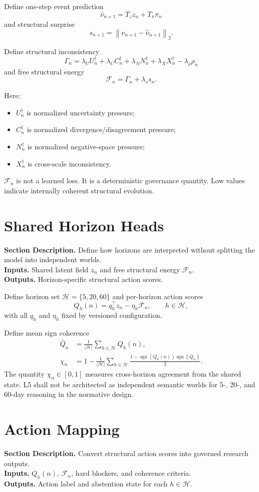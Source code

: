 \documentclass[11pt]{report}
\newcommand{\sgn}{\operatorname{sgn}}
\newcommand{\norm}[1]{\left\lVert #1 \right\rVert}
\newcommand{\meta}[3]{\textbf{Section Description.} #1\\
\textbf{Inputs.} #2\\
\textbf{Outputs.} #3\par}
\begin{document}
Define one-step event prediction
\[
\hat \nu_{n+1} = T_z z_n + T_\pi \pi_n
\]
and structural surprise
\[
s_{n+1} = \norm{\nu_{n+1}-\hat \nu_{n+1}}_2.
\]

Define structural inconsistency
\[
\Gamma_n = \lambda_U U_n^{\dagger} + \lambda_C C_n^{\dagger} + \lambda_N N_n^{\dagger} + \lambda_X X_n^{\dagger} - \lambda_\rho \rho_n
\]
and free structural energy
\[
\mathcal{F}_n = \Gamma_n + \lambda_s s_n.
\]

Here:
\begin{itemize}
    \item $U_n^{\dagger}$ is normalized uncertainty pressure;
    \item $C_n^{\dagger}$ is normalized divergence/disagreement pressure;
    \item $N_n^{\dagger}$ is normalized negative-space pressure;
    \item $X_n^{\dagger}$ is cross-scale inconsistency.
\end{itemize}

$\mathcal{F}_n$ is not a learned loss. It is a deterministic governance quantity. Low values indicate internally coherent structural evolution.

\section{Shared Horizon Heads}
\meta{Define how horizons are interpreted without splitting the model into independent worlds.}{Shared latent field $z_n$ and free structural energy $\mathcal{F}_n$.}{Horizon-specific structural action scores.}

Define horizon set $\mathcal{H}=\{5,20,60\}$ and per-horizon action scores
\[
Q_h(n)=q_h^{\top}z_n - \eta_h\mathcal{F}_n,\qquad h\in\mathcal{H},
\]
with all $q_h$ and $\eta_h$ fixed by versioned configuration.

Define mean sign coherence
\begin{align*}
\bar Q_n &= \frac{1}{|\mathcal{H}|}\sum_{h\in\mathcal{H}}Q_h(n),\\
\chi_n &= 1-\frac{1}{|\mathcal{H}|}\sum_{h\in\mathcal{H}}\frac{1-\sgn(Q_h(n))\sgn(\bar Q_n)}{2}.
\end{align*}
The quantity $\chi_n\in[0,1]$ measures cross-horizon agreement from the shared state. L5 shall not be architected as independent semantic worlds for 5-, 20-, and 60-day reasoning in the normative design.

\section{Action Mapping}
\meta{Convert structural action scores into governed research outputs.}{$Q_h(n)$, $\mathcal{F}_n$, hard blockers, and coherence criteria.}{Action label and abstention state for each $h\in\mathcal{H}$.}
\end{document}
